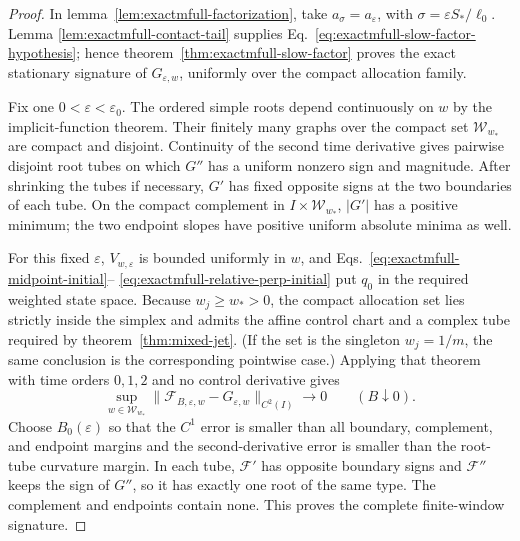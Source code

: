 \documentclass{iopjournal}
\theoremstyle{plain}
\theoremstyle{definition}
\begin{document}
\begin{proof}
In lemma~\ref{lem:exactmfull-factorization}, take
\(a_\sigma=a_\varepsilon\), with
\(\sigma=\varepsilon S_*/\ell_0\).  Lemma
\ref{lem:exactmfull-contact-tail} supplies
Eq.~\eqref{eq:exactmfull-slow-factor-hypothesis}; hence
theorem~\ref{thm:exactmfull-slow-factor} proves the exact stationary
signature of \(G_{\varepsilon,w}\), uniformly over the compact allocation
family.

Fix one \(0<\varepsilon<\varepsilon_0\).  The ordered simple roots depend
continuously on \(w\) by the implicit-function theorem.  Their finitely many
graphs over the compact set \(\mathcal W_{w_*}\) are compact and disjoint.
Continuity of the second time derivative gives pairwise disjoint root tubes
on which \(G''\) has a uniform nonzero sign and magnitude.  After shrinking
the tubes if necessary, \(G'\) has fixed opposite signs at the two boundaries
of each tube.  On the compact complement in
\(I\times\mathcal W_{w_*}\), \(|G'|\) has a positive minimum; the two endpoint
slopes have positive uniform absolute minima as well.

For this fixed \(\varepsilon\), \(V_{w,\varepsilon}\) is bounded uniformly in
\(w\), and Eqs.~\eqref{eq:exactmfull-midpoint-initial}--
\eqref{eq:exactmfull-relative-perp-initial} put \(q_0\) in the required
weighted state space.  Because \(w_j\ge w_*>0\), the compact allocation set
lies strictly inside the simplex and admits the affine control chart and a
complex tube required by theorem~\ref{thm:mixed-jet}.  (If the set is the
singleton \(w_j=1/m\), the same conclusion is the corresponding pointwise
case.)  Applying that theorem with time orders \(0,1,2\) and no control
derivative gives
\begin{equation}
 \sup_{w\in\mathcal W_{w_*}}
 \|\mathcal F_{B,\varepsilon,w}-G_{\varepsilon,w}\|_{C^2(I)}
 \longrightarrow0
 \qquad(B\downarrow0).
 \label{eq:exactmfull-fixed-epsilon-c2-transfer}
\end{equation}
Choose \(B_0(\varepsilon)\) so that the \(C^1\) error is smaller than all
boundary, complement, and endpoint margins and the second-derivative error
is smaller than the root-tube curvature margin.  In each tube,
\(\mathcal F'\) has opposite boundary signs and \(\mathcal F''\) keeps the
sign of \(G''\), so it has exactly one root of the same type.  The complement
and endpoints contain none.  This proves the complete finite-window
signature.
\end{proof}
\end{document}
